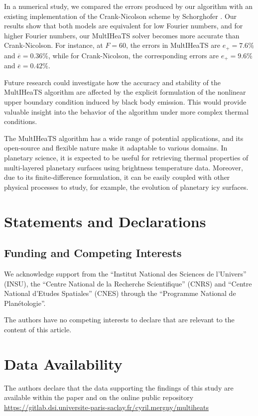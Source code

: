 \documentclass[sn-vancouver, Numbered]{sn-jnl}
\begin{document}
In a numerical study, we compared the errors produced by our algorithm with an existing implementation of the Crank-Nicolson scheme by Schorghofer \cite{Schorghofer2010}. Our results show that both models are equivalent for low Fourier numbers, and for higher Fourier numbers, our MultIHeaTS solver becomes more accurate than Crank-Nicolson.
For instance, at $F = 60$, the errors in MultIHeaTS are  $e_+ = 7.6 \%$ and $\overline{e} = 0.36\%$,  while for Crank-Nicolson, the corresponding errors are $e_+ = 9.6 \%$ and $\overline{e} = 0.42\%$.

Future research could investigate how the accuracy and stability of the MultIHeaTS algorithm are affected by the explicit formulation of the nonlinear upper boundary condition induced by black body emission. This would provide valuable insight into the behavior of the algorithm under more complex thermal conditions.

The MultIHeaTS algorithm has a wide range of potential applications, and its open-source and flexible nature make it adaptable to various domains. In planetary science, it is expected to be useful for retrieving thermal properties of multi-layered planetary surfaces using brightness temperature data. Moreover, due to its finite-difference formulation, it can be easily coupled with other physical processes to study, for example, the evolution of planetary icy surfaces.

\section*{Statements and Declarations}
\subsection*{Funding and Competing Interests}

We acknowledge support from the ``Institut National des Sciences de l'Univers'' (INSU), the ``Centre National de la Recherche Scientifique'' (CNRS) and ``Centre National d'Etudes Spatiales'' (CNES) through the ``Programme National de Plan{\'e}tologie''. 

The authors have no competing interests to declare that are relevant to the content of this article.

\section*{Data Availability}
The authors declare that the data supporting the findings of this study are available within the paper and on the online public repository  \url{https://gitlab.dsi.universite-paris-saclay.fr/cyril.mergny/multiheats}





%
\end{document}
